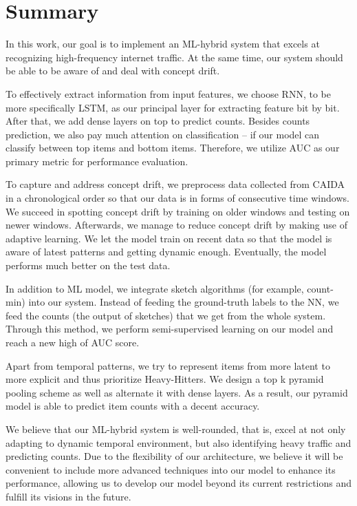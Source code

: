 \chapter{Summary}
\label{chapter:summary}
In this work, our goal is to implement an ML-hybrid system that excels at recognizing high-frequency internet traffic. At the same time, our system should be able to be aware of and deal with concept drift.

To effectively extract information from input features, we choose RNN, to be more specifically LSTM, as our principal layer for  extracting feature bit by bit. After that, we add dense layers on top to predict counts. Besides counts prediction, we also pay much attention on classification -- if our model can classify between top items and bottom items. Therefore, we utilize AUC as our primary metric for performance evaluation.

To capture and address concept drift, we preprocess data collected from CAIDA in a chronological order so that our data is in forms of consecutive time windows. We succeed in spotting concept drift by training on older windows and testing on newer windows. Afterwards, we manage to reduce concept drift by making use of adaptive learning. We let the model train on recent data so that the model is aware of latest patterns and getting dynamic enough. Eventually, the model performs much better on the test data.

In addition to ML model, we integrate sketch algorithms (for example, count-min) into our system. Instead of feeding the ground-truth labels to the NN, we feed the counts (the output of sketches) that we get from the whole
system. Through this method, we perform semi-supervised learning on our model and reach a new high of AUC score.

Apart from temporal patterns, we try to represent items from more latent to more explicit and thus prioritize Heavy-Hitters. We design a top k pyramid pooling scheme as well as alternate it with dense layers. As a result, our pyramid model is able to predict item counts with a decent accuracy. 

We believe that our ML-hybrid system is well-rounded, that is, excel at not only adapting to dynamic temporal environment, but also identifying heavy traffic and predicting counts. Due to the flexibility of our architecture, we believe it will be convenient to include more advanced techniques into our model to enhance its performance, allowing us to develop our model beyond its current restrictions and fulfill its visions in the future. 